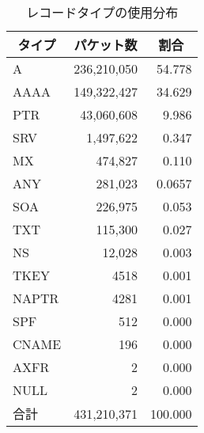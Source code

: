 \begin{table}[htbp]
 \caption{レコードタイプの使用分布}
 \centering
  \begin{tabular}{lrr}
    \toprule
    \multicolumn{1}{c}{\textbf{タイプ}} & \multicolumn{1}{c}{\textbf{パケット数}} & \multicolumn{1}{c}{\textbf{割合}} \\
    \midrule
    A & 236,210,050 & 54.778 \\
    AAAA & 149,322,427 & 34.629 \\
		PTR & 43,060,608 & 9.986 \\
		SRV & 1,497,622 & 0.347 \\
		MX & 474,827 & 0.110 \\
		ANY & 281,023 & 0.0657 \\
		SOA & 226,975 & 0.053 \\
		\rowcolor[gray]{0.8}%
		TXT & 115,300 & 0.027 \\
		NS & 12,028 & 0.003 \\
		TKEY & 4518 & 0.001 \\
		NAPTR & 4281 & 0.001 \\
		SPF & 512 & 0.000 \\
		\rowcolor[gray]{0.8}%
		CNAME & 196 & 0.000 \\
		AXFR & 2 & 0.000 \\
		\rowcolor[gray]{0.8}%
		NULL & 2 & 0.000 \\ 
		合計 & 431,210,371 & 100.000 \\
    \bottomrule
  \end{tabular}
 \label{tab:distribution-rtype}
\end{table}
